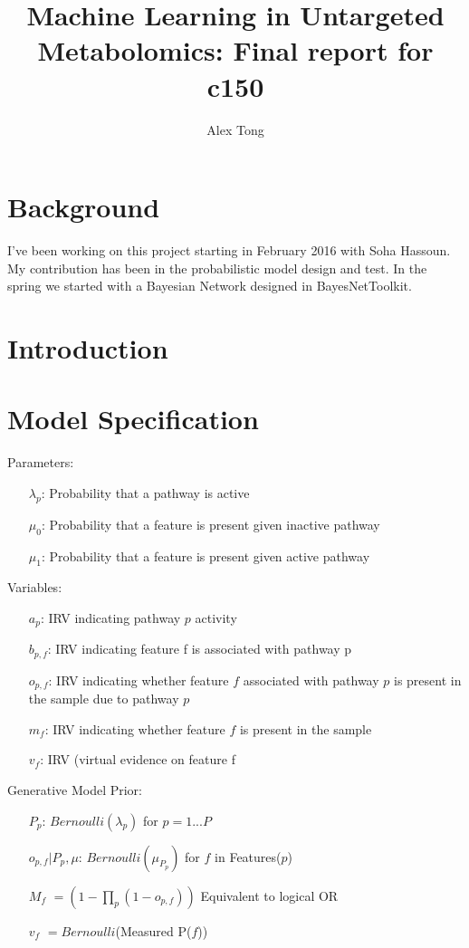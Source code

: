 \documentclass[11pt]{article}
\title{Machine Learning in Untargeted Metabolomics: Final report for c150}
\author{Alex Tong}
\begin{document}
\maketitle

\section{Background}

I've been working on this project starting in February 2016 with Soha Hassoun. My contribution has been in the probabilistic model design and test. In the spring we started with a Bayesian Network designed in BayesNetToolkit. \cite{bayesnet}

\section{Introduction}

\section{Model Specification}
Parameters:
\begin{itemize}
\item[$\lambda_p$:] Probability that a pathway is active
\item[$\mu_0$:] Probability that a feature is present given inactive pathway
\item[$\mu_1$:] Probability that a feature is present given active pathway
\end{itemize}

Variables:
\begin{itemize}
\item [$a_p$:] IRV indicating pathway $p$ activity
\item [$b_{p,f}$:] IRV indicating feature f is associated with pathway p
\item[$o_{p,f}$:] IRV indicating whether feature $f$ associated with pathway $p$ is present in the sample due to pathway $p$
\item[$m_f$:] IRV indicating whether feature $f$ is present in the sample
\item[$v_f$:] IRV (virtual evidence on feature f
\end{itemize}

Generative Model Prior:
\begin{itemize}
\item [$P_p$:] $Bernoulli(\lambda_p)$ for $p = 1 ... P$
\item [$o_{p,f} | P_p, \mu$:] $Bernoulli(\mu_{P_p})$ for $f$ in Features($p$)
\item [$M_f$]  $= (1 -  \prod_p (1 - o_{p,f}))$ Equivalent to logical OR
\item [$v_f$] $= Bernoulli$(Measured P($f$))
\end{itemize}
\end{document}
